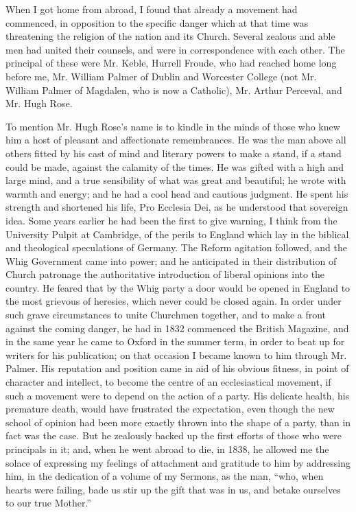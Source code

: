 When I got home from abroad, I found that already a movement had
commenced, in opposition to the specific danger which at that time was
threatening the religion of the nation and its Church. Several zealous
and able men had united their counsels, and were in correspondence with
each other. The principal of these were Mr. Keble, Hurrell Froude, who
had reached home long before me, Mr. William Palmer of Dublin and
Worcester College (not Mr. William Palmer of Magdalen, who is
now a Catholic), Mr. Arthur Perceval, and Mr. Hugh Rose.

To mention Mr. Hugh Rose's name is to kindle in the minds of those
who knew him a host of pleasant and affectionate remembrances. He was
the man above all others fitted by his cast of mind and literary powers
to make a stand, if a stand could be made, against the calamity of
the times. He was gifted with a high and large mind, and a true
sensibility of what was great and beautiful; he wrote with warmth and
energy; and he had a cool head and cautious judgment. He spent his
strength and shortened his life, Pro Ecclesia Dei, as he understood that
sovereign idea. Some years earlier he had been the first to give
warning, I think from the University Pulpit at Cambridge, of the perils
to England which lay in the biblical and theological speculations of
Germany. The Reform agitation followed, and the Whig Government came
into power; and he anticipated in their distribution of Church patronage
the authoritative introduction of liberal opinions into the country. He feared
that by the Whig party a door would be opened in England to the most
grievous of heresies, which never could be closed again. In order under
such grave circumstances to unite Churchmen together, and to make a
front against the coming danger, he had in 1832 commenced the British
Magazine, and in the same year he came to Oxford in the summer term, in
order to beat up for writers for his publication; on that occasion I
became known to him through Mr. Palmer. His reputation and position came
in aid of his obvious fitness, in point of character and intellect, to
become the centre of an ecclesiastical movement, if such a movement were
to depend on the action of a party. His delicate health, his premature
death, would have frustrated the expectation, even though the new school
of opinion had been more exactly thrown into the shape of a party, than
in fact was the case. But he zealously backed up the first efforts of
those who were principals in it; and, when he went abroad to die, in
1838, he allowed me the solace of expressing my feelings of attachment
and gratitude to him by addressing him, in the dedication of a volume of
my Sermons, as the man, ``who, when hearts were failing, bade us
stir up the gift that was in us, and betake ourselves to our true
Mother.''

